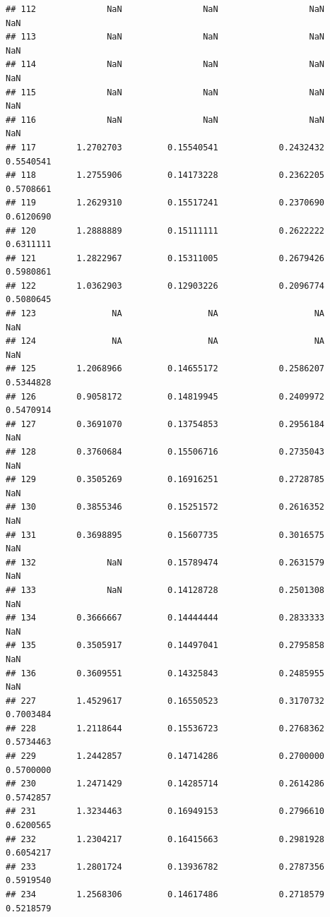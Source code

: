 \documentclass[]{article}
\begin{document}
\begin{verbatim}
## 112              NaN                NaN                  NaN              NaN
## 113              NaN                NaN                  NaN              NaN
## 114              NaN                NaN                  NaN              NaN
## 115              NaN                NaN                  NaN              NaN
## 116              NaN                NaN                  NaN              NaN
## 117        1.2702703         0.15540541            0.2432432        0.5540541
## 118        1.2755906         0.14173228            0.2362205        0.5708661
## 119        1.2629310         0.15517241            0.2370690        0.6120690
## 120        1.2888889         0.15111111            0.2622222        0.6311111
## 121        1.2822967         0.15311005            0.2679426        0.5980861
## 122        1.0362903         0.12903226            0.2096774        0.5080645
## 123               NA                 NA                   NA              NaN
## 124               NA                 NA                   NA              NaN
## 125        1.2068966         0.14655172            0.2586207        0.5344828
## 126        0.9058172         0.14819945            0.2409972        0.5470914
## 127        0.3691070         0.13754853            0.2956184              NaN
## 128        0.3760684         0.15506716            0.2735043              NaN
## 129        0.3505269         0.16916251            0.2728785              NaN
## 130        0.3855346         0.15251572            0.2616352              NaN
## 131        0.3698895         0.15607735            0.3016575              NaN
## 132              NaN         0.15789474            0.2631579              NaN
## 133              NaN         0.14128728            0.2501308              NaN
## 134        0.3666667         0.14444444            0.2833333              NaN
## 135        0.3505917         0.14497041            0.2795858              NaN
## 136        0.3609551         0.14325843            0.2485955              NaN
## 227        1.4529617         0.16550523            0.3170732        0.7003484
## 228        1.2118644         0.15536723            0.2768362        0.5734463
## 229        1.2442857         0.14714286            0.2700000        0.5700000
## 230        1.2471429         0.14285714            0.2614286        0.5742857
## 231        1.3234463         0.16949153            0.2796610        0.6200565
## 232        1.2304217         0.16415663            0.2981928        0.6054217
## 233        1.2801724         0.13936782            0.2787356        0.5919540
## 234        1.2568306         0.14617486            0.2718579        0.5218579

\end{verbatim}
\end{document}

